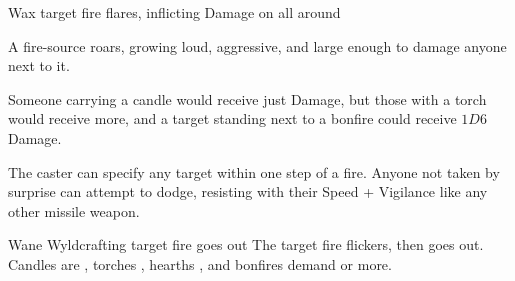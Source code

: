   {\mFire}%
  {Wax}%
  {}%
  {}%
  {target fire flares, inflicting  Damage on all around}%
  {
    A fire-source roars, growing loud, aggressive, and large enough to damage anyone next to it.

    Someone carrying a candle would receive just  Damage, but those with a torch would receive more, and a target standing next to a bonfire could receive $1D6$ Damage.

    The caster can specify any target within one step of a fire.
    Anyone not taken by surprise can attempt to dodge, resisting with their Speed + Vigilance like any other missile weapon.
  }

  {\mFire}%
  {Wane}%
  {}%
  {Wyldcrafting}%
  {target fire goes out}%
  {
    The target fire flickers, then goes out.
    Candles are , torches , hearths , and bonfires demand  or more.
  }

